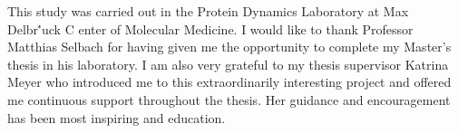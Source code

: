 \documentclass[
12pt, %
english, %
onehalfspacing, %
headsepline, %
]{MastersDoctoralThesis} %
\begin{document}

\begin{acknowledgements}
\addchaptertocentry{\acknowledgementname} %
This study was carried out in the Protein Dynamics Laboratory at Max Delbr\''{u}ck C	enter of Molecular Medicine. I would like to thank Professor Matthias Selbach for having given me the opportunity to complete my Master's thesis in his laboratory. I am also very grateful to my thesis supervisor Katrina Meyer who introduced me to this extraordinarily interesting project and offered me continuous support throughout the thesis. Her guidance and encouragement has been most inspiring and education.
\end{acknowledgements}




%
%
%

\begin{Literature}
\addchaptertocentry{\literaturename} 
\nocite{apsrev41Control}

\end{Literature}

\end{document}
